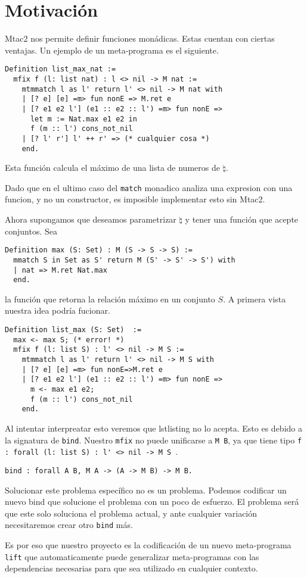 \section{Motivación}

Mtac2 nos permite definir funciones monádicas. Estas cuentan con ciertas ventajas. Un ejemplo de un meta-programa es el siguiente.

\begin{lstlisting}
Definition list_max_nat :=
  mfix f (l: list nat) : l <> nil -> M nat :=
    mtmmatch l as l' return l' <> nil -> M nat with
    | [? e] [e] =m> fun nonE => M.ret e
    | [? e1 e2 l'] (e1 :: e2 :: l') =m> fun nonE =>
      let m := Nat.max e1 e2 in
      f (m :: l') cons_not_nil
    | [? l' r'] l' ++ r' => (* cualquier cosa *) 
    end.
\end{lstlisting}

Esta función calcula el máximo de una lista de numeros de $\natural$.

Dado que en el ultimo caso del \lstinline{match} monadico analiza una expresion
con una funcion, y no un constructor, es imposible implementar esto sin Mtac2.

Ahora supongamos que deseamos parametrizar $\natural$ y tener una función que acepte conjuntos. Sea
\begin{lstlisting}
Definition max (S: Set) : M (S -> S -> S) :=
  mmatch S in Set as S' return M (S' -> S' -> S') with
  | nat => M.ret Nat.max
  end.
\end{lstlisting}

la función que retorna la relación máximo en un conjunto $S$. A primera vista nuestra idea podría fucionar.

\begin{lstlisting}
Definition list_max (S: Set)  :=
  max <- max S; (* error! *)
  mfix f (l: list S) : l' <> nil -> M S :=
    mtmmatch l as l' return l' <> nil -> M S with
    | [? e] [e] =m> fun nonE=>M.ret e
    | [? e1 e2 l'] (e1 :: e2 :: l') =m> fun nonE =>
      m <- max e1 e2;
      f (m :: l') cons_not_nil
    end.
\end{lstlisting}

Al intentar interpreatar esto veremos que lstlisting no lo acepta. Esto es debido a la signatura de \lstinline{bind}. Nuestro \lstinline{mfix} no puede
unificarse a \lstinline{M B}, ya que tiene tipo \lstinline{f : forall (l: list S) : l' <> nil -> M S }.

\begin{lstlisting}
bind : forall A B, M A -> (A -> M B) -> M B.
\end{lstlisting}

Solucionar este problema específico no es un problema. Podemos codificar un nuevo bind que solucione el problema con un poco de esfuerzo.
El problema será que este solo soluciona el problema actual, y ante cualquier variación necesitaremos crear otro \lstinline{bind} más.

Es por eso que nuestro proyecto es la codificación de un nuevo meta-programa \lstinline{lift} que automaticamente puede generalizar meta-programas
con las dependencias necesarias para que sea utilizado en cualquier contexto.
